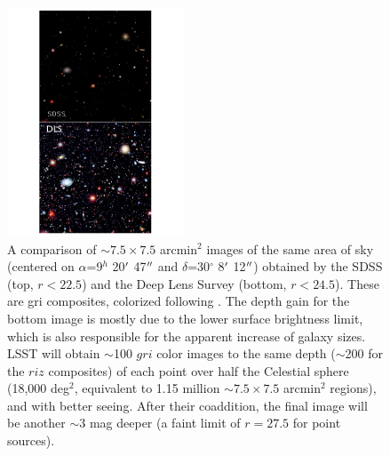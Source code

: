 \begin{figure}
\begin{center}
\includegraphics[width=0.47\textwidth,clip]{panels1_2}
\end{center}
\caption{A comparison of $\sim7.5\times7.5$ arcmin$^2$ images of
the same area of sky (centered on $\alpha$=9$^h$ 20$\mbox{$^\prime$}$ 47$\mbox{$^{\prime\prime}$}$ and
$\delta$=30$^\circ$ 8$\mbox{$^\prime$}$ 12$\mbox{$^{\prime\prime}$}$) obtained by the SDSS (top, $r<22.5$) and
the Deep Lens Survey (bottom, $r<24.5$). These are gri composites,
colorized following \citet{2004PASP..116..133L}.  The depth gain for the bottom image
is mostly due to the lower surface brightness limit, which is also responsible
for the apparent increase of galaxy sizes. LSST will obtain $\sim$100 $gri$
color images to the same depth ($\sim$200 for the $riz$ composites) of each point
over half the Celestial sphere (18,000 deg$^2$, equivalent to 1.15 million $\sim7.5\times7.5$
arcmin$^2$ regions), and with better seeing. After their coaddition, the final
image will be another $\sim3$ mag deeper (a faint limit of $r=27.5$ for point
sources).}
\label{Fig:panels1}
\end{figure}

